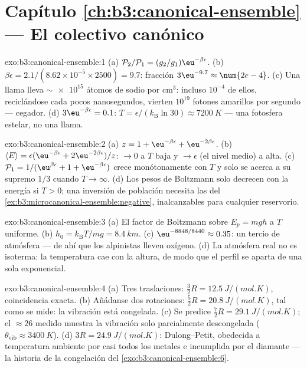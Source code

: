 \section*{Capítulo \ref{ch:b3:canonical-ensemble} --- El colectivo canónico}

\begin{solution}{exo:b3:canonical-ensemble:1}
(a) $\mathcal P_2/\mathcal P_1 = (g_2/g_1)\eu^{-\beta\epsilon}$.
(b) $\beta\epsilon = 2.1/(8.62\times10^{-5} \times 2500) = 9.7$:
fracción $3\eu^{-9.7} \approx \num{2e-4}$. (c) Una llama lleva
$\sim\num{e15}$ átomos de sodio por cm$^3$: incluso $10^{-4}$ de ellos,
reciclándose cada pocos nanosegundos, vierten $10^{19}$ fotones amarillos
por segundo --- cegador. (d) $3\eu^{-\beta\epsilon} = 0.1$:
$T = \epsilon/(k_{\text{B}}\ln30) \approx \qty{7200}{K}$ --- una
fotosfera estelar, no una llama.
\end{solution}

\begin{solution}{exo:b3:canonical-ensemble:2}
(a) $z = 1 + \eu^{-\beta\epsilon} + \eu^{-2\beta\epsilon}$. (b)
$\langle E\rangle = \epsilon(\eu^{-\beta\epsilon} +
2\eu^{-2\beta\epsilon})/z$: $\to 0$ a $T$ baja y $\to \epsilon$
(el nivel medio) a alta. (c) $\mathcal P_1 = 1/(\eu^{\beta
\epsilon} + 1 + \eu^{-\beta\epsilon})$ crece monótonamente con
$T$ y solo se acerca a su supremo $1/3$ cuando $T \to \infty$. (d)
Los pesos de Boltzmann solo decrecen con la energía si $T > 0$; una
inversión de población necesita las  del
\cref{ex:b3:microcanonical-ensemble:negative}, inalcanzables para cualquier
reservorio.
\end{solution}

\begin{solution}{exo:b3:canonical-ensemble:3}
(a) El factor de Boltzmann sobre $E_p = mgh$ a $T$ uniforme. (b) $h_0 =
k_{\text{B}}T/mg = \qty{8.4}{km}$. (c) $\eu^{-8848/8440} \approx
0.35$: un tercio de atmósfera --- de ahí que los alpinistas lleven oxígeno.
(d) La atmósfera real no es isoterma: la temperatura cae con la
altura, de modo que el perfil se aparta de una sola exponencial.
\end{solution}

\begin{solution}{exo:b3:canonical-ensemble:4}
(a) Tres traslaciones: $\tfrac32 R = \qty{12.5}{J/(mol.K)}$,
coincidencia exacta. (b) Añádanse dos rotaciones: $\tfrac52 R =
\qty{20.8}{J/(mol.K)}$, tal como se mide: la vibración está congelada. (c)
Se predice $\tfrac72 R = \qty{29.1}{J/(mol.K)}$; el $\approx26$ medido
muestra la vibración solo parcialmente descongelada ($\theta_{\text{vib}}
\approx \qty{3400}{K}$). (d) $3R = \qty{24.9}{J/(mol.K)}$:
Dulong--Petit, obedecida a temperatura ambiente por casi todos los metales e
incumplida por el diamante --- la historia de la congelación del
\cref{exo:b3:canonical-ensemble:6}.
\end{solution}

